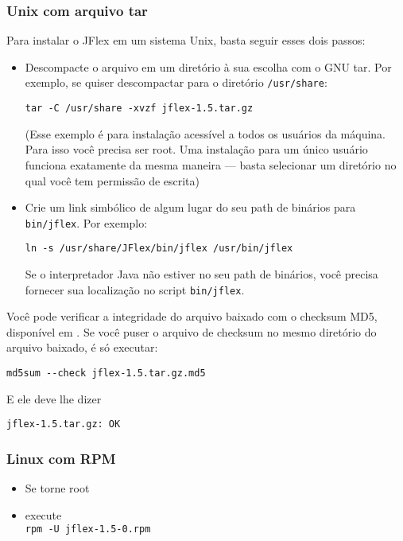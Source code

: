 \documentclass[11pt]{scrartcl}
\newcommand{\ver}{1.5}
\begin{document}
\subsubsection{Unix com arquivo tar}

Para instalar o JFlex em um sistema Unix, basta seguir esses dois passos:
\begin{itemize}
\item
  Descompacte o arquivo em um diret\'orio \`a sua escolha com o GNU tar. Por exemplo, se quiser descompactar para o diret\'orio \texttt{/usr/share}:

  \texttt{tar -C /usr/share -xvzf jflex-\ver.tar.gz}
  
  (Esse exemplo \'e para instala\c{c}\~ao acess\'ivel a todos os usu\'arios da m\'aquina. Para isso voc\^e precisa ser
  root. Uma instala\c{c}\~ao para um \'unico usu\'ario funciona exatamente da mesma maneira --- basta selecionar
  um diret\'orio no qual voc\^e tem permiss\~ao de escrita)

\item
  Crie um link simb\'olico de algum lugar do seu path de bin\'arios para \texttt{bin/jflex}. Por exemplo:

  \texttt{ln -s /usr/share/JFlex/bin/jflex /usr/bin/jflex}

  Se o interpretador Java n\~ao estiver no seu path de bin\'arios, voc\^e precisa fornecer sua localiza\c{c}\~ao no script \texttt{bin/jflex}.
\end{itemize}

Voc\^e pode verificar a integridade do arquivo baixado com o checksum MD5,
dispon\'ivel em . 
Se voc\^e puser o arquivo de checksum no mesmo diret\'orio do arquivo baixado, \'e s\'o executar:

\verb+md5sum --check +\texttt{jflex-\ver.tar.gz.md5}

E ele deve lhe dizer

\texttt{jflex-\ver.tar.gz: OK}

\subsubsection{Linux com RPM}

\begin{itemize}
\item
  Se torne root
\item execute\\
  \texttt{rpm -U jflex-\ver-0.rpm}
\end{itemize}
\end{document}
